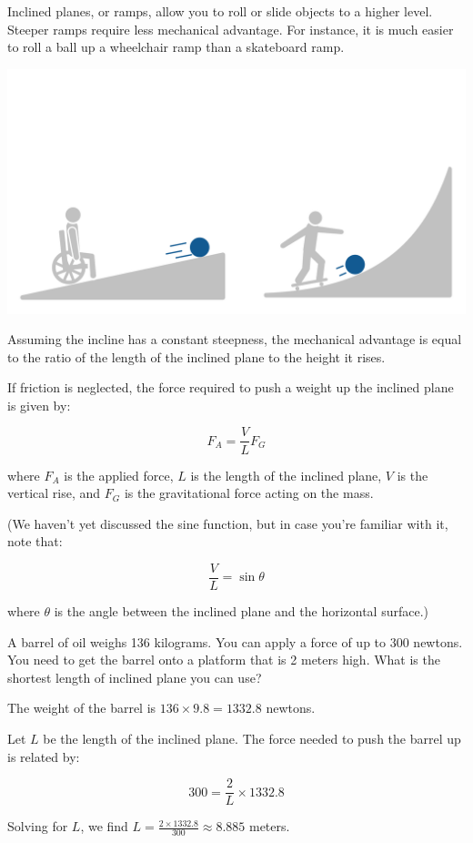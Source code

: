 Inclined planes, or ramps, allow you to roll or slide objects to a higher level. Steeper ramps require less mechanical advantage. For instance, it is much easier to roll a ball up a wheelchair ramp than a skateboard ramp.

\includegraphics[width=\textwidth]{rampcomparison.png}

Assuming the incline has a constant steepness, the mechanical advantage is equal to the ratio of the length of the inclined plane to the height it rises.

If friction is neglected, the force required to push a weight up the inclined plane is given by:

\[
F_A = \frac{V}{L} F_G
\]

where \( F_A \) is the applied force, \( L \) is the length of the inclined plane, \( V \) is the vertical rise, and \( F_G \) is the gravitational force acting on the mass.

(We haven't yet discussed the sine function, but in case you're familiar with it, note that:

\[
\frac{V}{L} = \sin{\theta}
\]

where \( \theta \) is the angle between the inclined plane and the horizontal surface.)

\begin{Exercise}[title={Ramp}, label=ramp]
A barrel of oil weighs 136 kilograms. You can apply a force of up to 300 newtons. You need to get the barrel onto a platform that is 2 meters high. What is the shortest length of inclined plane you can use?
\end{Exercise}
\begin{Answer}[ref=ramp]
The weight of the barrel is \( 136 \times 9.8 = 1332.8 \) newtons.

Let \( L \) be the length of the inclined plane. The force needed to push the barrel up is related by:

\[
300 = \frac{2}{L} \times 1332.8
\]

Solving for \( L \), we find \( L = \frac{2 \times 1332.8}{300} \approx 8.885 \) meters.
\end{Answer}


